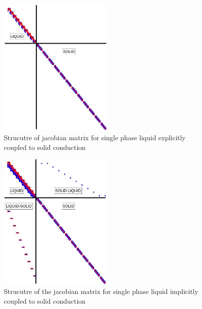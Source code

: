 	\begin{figure}[!h]
    	\centering
    	\includegraphics[width=0.50\textwidth]{images/Explicit-Diagram.jpg}
    	\caption{Strucutre of jacobian matrix for single phase liquid
    	explicitly coupled to solid conduction}
    	\label{fig:Explicit-Diagram}
    \end{figure}
    
    \begin{figure}[!h]
    	\centering
    	\includegraphics[width=0.50\textwidth]{images/Implicit-Diagram.jpg}
    	\caption{Strucutre of the jacobian matrix for single phase liquid
    	implicitly coupled to solid conduction}
    	\label{fig:Implicit-Diagram}
    \end{figure}
    
